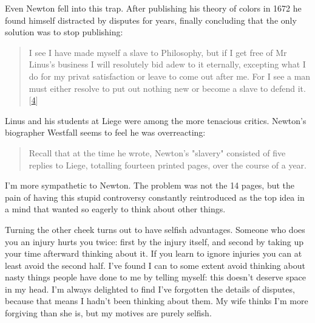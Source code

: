 Even Newton fell into this trap. After
                    publishing his theory of colors in 1672 he found himself
                    distracted by disputes for years, finally concluding that
                    the only solution was to stop publishing:
                  


                  \begin{quote}

                    I see I have made myself a slave to Philosophy, but if I get
                    free of Mr Linus's business I will resolutely bid adew to it
                    eternally, excepting what I do for my privat satisfaction or
                    leave to come out after me. For I see a man must either
                    resolve to put out nothing new or become a slave to defend
                    it.
                    [\href{\#f4n}{4}]
                  
\end{quote}

                  Linus and his students at Liege were among the more tenacious
                  critics. Newton's biographer Westfall seems to feel he was
                  overreacting:
                  \begin{quote}

                    Recall that at the time he wrote, Newton's "slavery"
                    consisted of five replies to Liege, totalling fourteen
                    printed pages, over the course of a year.
                  
\end{quote}

                  I'm more sympathetic to Newton. The problem was not the 14
                  pages, but the pain of having this stupid controversy
                  constantly reintroduced as the top idea in a mind that wanted
                  so eagerly to think about other things.

Turning the
                  other cheek turns out to have selfish advantages. Someone who
                  does you an injury hurts you twice: first by the injury
                  itself, and second by taking up your time afterward thinking
                  about it. If you learn to ignore injuries you can at least
                  avoid the second half. I've found I can to some extent avoid
                  thinking about nasty things people have done to me by telling
                  myself: this doesn't deserve space in my head. I'm always
                  delighted to find I've forgotten the details of disputes,
                  because that means I hadn't been thinking about them. My wife
                  thinks I'm more forgiving than she is, but my motives are
                  purely selfish.

